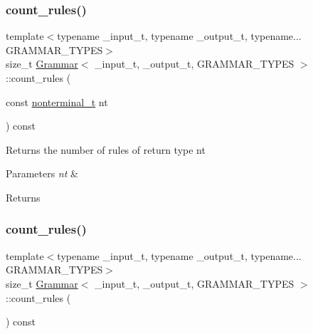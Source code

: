 \subsubsection{\texorpdfstring{count\+\_\+rules()}{count\_rules()}\hspace{0.1cm}{\footnotesize\ttfamily [1/2]}}
{\footnotesize\ttfamily template$<$typename \+\_\+input\+\_\+t, typename \+\_\+output\+\_\+t, typename... G\+R\+A\+M\+M\+A\+R\+\_\+\+T\+Y\+P\+ES$>$ \\
size\+\_\+t \hyperlink{class_grammar}{Grammar}$<$ \+\_\+input\+\_\+t, \+\_\+output\+\_\+t, G\+R\+A\+M\+M\+A\+R\+\_\+\+T\+Y\+P\+ES $>$\+::count\+\_\+rules (\begin{DoxyParamCaption}\item[{const \hyperlink{_nonterminal_8h_a1c5bfe9b903f69c83bbde5da7035fef3}{nonterminal\+\_\+t}}]{nt }\end{DoxyParamCaption}) const\hspace{0.3cm}{\ttfamily [inline]}}

Returns the number of rules of return type nt 
\begin{DoxyParams}{Parameters}
{\em nt} & \\
\hline
\end{DoxyParams}
\begin{DoxyReturn}{Returns}

\end{DoxyReturn}
\mbox{\label{class_grammar_af6f447aca4141c52f3197eac688c0be7}} 
\subsubsection{\texorpdfstring{count\+\_\+rules()}{count\_rules()}\hspace{0.1cm}{\footnotesize\ttfamily [2/2]}}
{\footnotesize\ttfamily template$<$typename \+\_\+input\+\_\+t, typename \+\_\+output\+\_\+t, typename... G\+R\+A\+M\+M\+A\+R\+\_\+\+T\+Y\+P\+ES$>$ \\
size\+\_\+t \hyperlink{class_grammar}{Grammar}$<$ \+\_\+input\+\_\+t, \+\_\+output\+\_\+t, G\+R\+A\+M\+M\+A\+R\+\_\+\+T\+Y\+P\+ES $>$\+::count\+\_\+rules (\begin{DoxyParamCaption}{ }\end{DoxyParamCaption}) const\hspace{0.3cm}{\ttfamily [inline]}}

